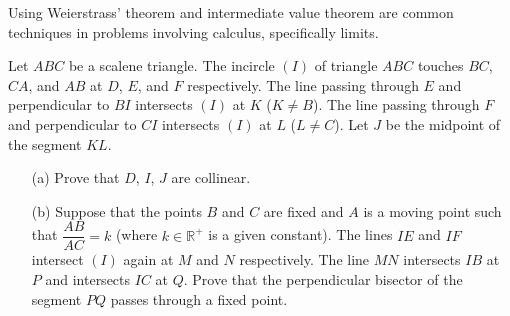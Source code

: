 \documentclass[11pt]{article}
\theoremstyle{definition}
\begin{document}
        \begin{remark}
            Using Weierstrass' theorem and intermediate value theorem are common techniques in problems involving calculus, specifically limits.
        \end{remark}

        \newpage

        \begin{problem}
            Let \(ABC\) be a scalene triangle. The incircle \((I)\) of triangle \(ABC\) touches \(BC\), \(CA\), and \(AB\) at \(D\), \(E\), and \(F\) respectively. The line passing through \(E\) and perpendicular to \(BI\) intersects \((I)\) at \(K\) (\(K \neq B\)). The line passing through \(F\) and perpendicular to \(CI\) intersects \((I)\) at \(L\) (\(L \neq C\)). Let \(J\) be the midpoint of the segment \(KL\).
            \begin{enumerate}
                \item[(a)] Prove that \(D\), \(I\), \(J\) are collinear.
                \item[(b)] Suppose that the points \(B\) and \(C\) are fixed and \(A\) is a moving point such that \(\dfrac{AB}{AC} = k\) (where \(k \in \mathbb{R}^+\) is a given constant). The lines \(IE\) and \(IF\) intersect \((I)\) again at \(M\) and \(N\) respectively. The line \(MN\) intersects \(IB\) at \(P\) and intersects \(IC\) at \(Q\). Prove that the perpendicular bisector of the segment \(PQ\) passes through a fixed point.
            \end{enumerate}
        \end{problem}
\end{document}
